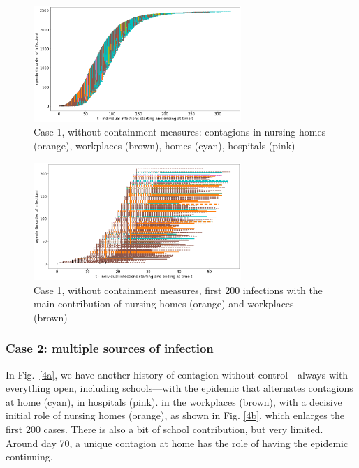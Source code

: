 \documentclass[graybox]{svmult}
\begin{document}
\begin{figure}[t]
\begin{center}
\includegraphics[width=0.7\textwidth]{no3a.png} %
\caption{Case 1, without containment measures: contagions in nursing homes (orange), workplaces (brown), homes (cyan), hospitals (pink)}
\label{3a}
\end{center}
\end{figure}

\begin{figure}[t]
\begin{center}
\includegraphics[width=0.7\textwidth]{no3b.png} %
\caption{Case 1, without containment measures, first 200 infections with the main contribution of nursing homes (orange) and workplaces (brown)}
\label{3b}
\end{center}
\end{figure}


\subsubsection{Case 2: multiple sources of infection}
\label{c2}

In Fig.~\ref{4a}, we have another history of contagion without control---always with everything open, including schools---with the epidemic that alternates contagions at home (cyan), in hospitals (pink). in the workplaces (brown), with a decisive initial role of nursing homes (orange), as shown in Fig. \ref{4b}, which enlarges the first 200 cases. There is also a bit of school contribution, but very limited. Around day 70, a unique contagion at home has the role of having the epidemic continuing.
\end{document}
